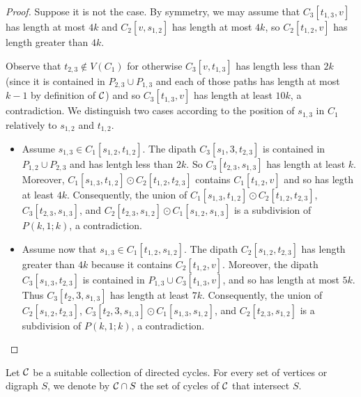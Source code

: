 \documentclass[utf8,11pt]{article}
\theoremstyle{plain}
\theoremstyle{definition}
\theoremstyle{remark}
\begin{document}
\begin{proof}
Suppose it is not the case. By symmetry, we may assume that $C_3[t_{1,3},v]$ has length at most $4k$ and
$C_2[v, s_{1,2}]$ has length at most $4k$, so  $C_2[t_{1,2},v]$ has length greater than $4k$.

Observe that $t_{2,3}\notin V(C_1)$ for otherwise $C_3[v,t_{1,3}]$ has length less than $2k$ (since it is contained in $P_{2,3}\cup P_{1,3}$ and each of those paths has length at most $k-1$ by definition of ${\cal C}$) and so $C_3[t_{1,3},v]$ has length at least $10k$, a contradiction.
We distinguish two cases according to the position of $s_{1,3}$ in $C_1$ relatively to $s_{1,2}$ and $t_{1,2}$.

\begin{itemize}
	\item Assume $s_{1,3}\in C_1[s_{1,2},t_{1,2}]$. The dipath  $C_3[s_1,3,t_{2,3}]$ is contained in $P_{1,2}\cup P_{2,3}$ and has lentgh less than $2k$. So $C_3[t_{2,3}, s_{1,3}]$ has length at least $k$. Moreover, $C_1[s_{1,3}, t_{1,2}]\odot C_2[t_{1,2}, t_{2,3}]$ contains $C_1[t_{1,2}, v]$  and so has legth at least $4k$. Consequently, the union of $C_1[s_{1,3}, t_{1,2}]\odot C_2[t_{1,2}, t_{2,3}]$, $C_3[t_{2,3}, s_{1,3}]$, and
$C_2[t_{2,3}, s_{1,2}]\odot C_1[s_{1,2}, s_{1,3}]$ is a subdivision of $P(k,1;k)$, a contradiction.

	\item Assume now that $s_{1,3}\in C_1[t_{1,2},s_{1,2}]$. The dipath  $C_2[s_{1,2}, t_{2,3}]$ has length greater than $4k$ because it contains $C_2[t_{1,2},v]$. Moreover, the dipath $C_3[s_{1,3}, t_{2,3}]$ is contained in $P_{1,3}\cup C_3[t_{1,3},v]$, and so has length at most $5k$.
	Thus $C_3[t_2,3, s_{1,3}]$ has length at least $7k$.
	 Consequently, the union of $C_2[s_{1,2}, t_{2,3}]$, $C_3[t_2,3, s_{1,3}]\odot C_1[s_{1,3}, s_{1,2}]$, and $C_2[t_{2,3}, s_{1,2}]$ is a subdivision of $P(k,1;k)$, a contradiction.
\end{itemize}
\end{proof}
 
 
 
 
 
 

Let ${\cal C}$ be a suitable collection of directed cycles.
For every set of vertices or digraph $S$, we denote by ${\cal C}\cap S$ the set of cycles of ${\cal C}$ that intersect $S$. 
\end{document}
